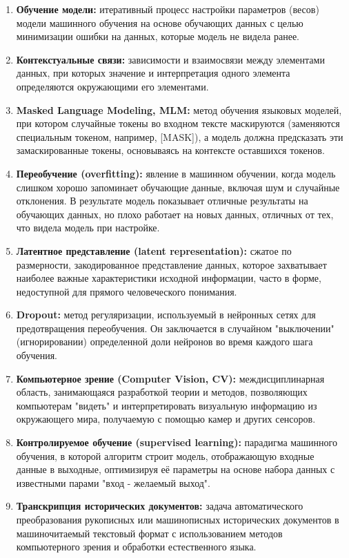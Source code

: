 \begin{enumerate}
    \item  \textbf{Обучение модели:} итеративный процесс настройки параметров (весов) модели машинного обучения на основе обучающих данных с целью минимизации ошибки на данных, которые модель не видела ранее.
    \item  \textbf{Контекстуальные связи:} зависимости и взаимосвязи между элементами данных, при которых значение и интерпретация одного элемента определяются окружающими его элементами.  
    \item  \textbf{Masked Language Modeling, MLM:} метод обучения языковых моделей, при котором случайные токены во входном тексте маскируются (заменяются специальным токеном, например, [MASK]), а модель должна предсказать эти замаскированные токены, основываясь на контексте оставшихся токенов.
    \item  \textbf{Переобучение (overfitting):} явление в машинном обучении, когда модель слишком хорошо запоминает обучающие данные, включая шум и случайные отклонения. В результате модель показывает отличные результаты на обучающих данных, но плохо работает на новых данных, отличных от тех, что видела модель при настройке.
    \item  \textbf{Латентное представление (latent representation):} сжатое по размерности, закодированное представление данных, которое захватывает наиболее важные характеристики исходной информации, часто в форме, недоступной для прямого человеческого понимания. 
    \item  \textbf{Dropout:} метод регуляризации, используемый в нейронных сетях для предотвращения переобучения. Он заключается в случайном "выключении" (игнорировании) определенной доли нейронов во время каждого шага обучения.
    \item  \textbf{Компьютерное зрение (Computer Vision, CV):} междисциплинарная область, занимающаяся разработкой теории и методов,  позволяющих компьютерам "видеть"   и интерпретировать визуальную информацию из окружающего мира, получаемую с помощью камер и других сенсоров.
    \item  \textbf{Контролируемое обучение (supervised learning):} парадигма машинного обучения, в которой алгоритм строит модель, отображающую входные данные в выходные,  оптимизируя  её  параметры  на  основе  набора  данных  с  известными  парами  "вход - желаемый  выход". 
    \item  \textbf{Транскрипция исторических документов:} задача автоматического преобразования рукописных или машинописных исторических документов в машиночитаемый текстовый формат с использованием методов компьютерного зрения и обработки естественного языка. 
\end{enumerate} 
    

\newpage
